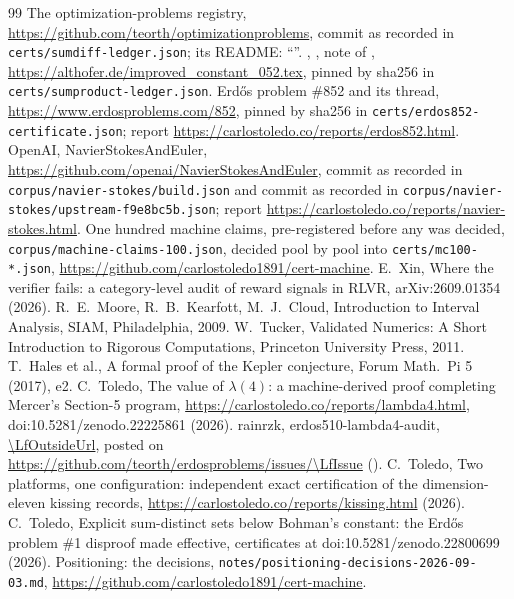 \documentclass[11pt]{article}
\theoremstyle{plain}
\theoremstyle{definition}
\begin{document}
\begin{thebibliography}{99}
 The optimization-problems registry, \url{https://github.com/teorth/optimizationproblems}, commit \OcRegistryCommit{} as recorded in \texttt{certs/sumdiff-ledger.json}; its README: ``\OcStarNote''.
 \SpNoteAuthor, \SpNoteTitle, note of \SpNoteDate, \url{https://althofer.de/improved_constant_052.tex}, pinned by sha256 in \texttt{certs/sumproduct-ledger.json}.
 Erd\H{o}s problem \#852 and its thread, \url{https://www.erdosproblems.com/852}, pinned by sha256 in \texttt{certs/erdos852-certificate.json}; report \url{https://carlostoledo.co/reports/erdos852.html}.
 OpenAI, NavierStokesAndEuler, \url{https://github.com/openai/NavierStokesAndEuler}, commit \NsCommit{} as recorded in \texttt{corpus/navier-stokes/build.json} and commit \NsHeadCommit{} as recorded in \texttt{corpus/navier-stokes/upstream-f9e8bc5b.json}; report \url{https://carlostoledo.co/reports/navier-stokes.html}.
 One hundred machine claims, pre-registered \McRegistered{} before any was decided, \texttt{corpus/machine-claims-100.json}, decided pool by pool into \texttt{certs/mc100-*.json}, \url{https://github.com/carlostoledo1891/cert-machine}.
 E.~Xin, Where the verifier fails: a category-level audit of reward signals in RLVR, arXiv:2609.01354 (2026).
 R.~E.~Moore, R.~B.~Kearfott, M.~J.~Cloud, Introduction to Interval Analysis, SIAM, Philadelphia, 2009.
 W.~Tucker, Validated Numerics: A Short Introduction to Rigorous Computations, Princeton University Press, 2011.
 T.~Hales et al., A formal proof of the Kepler conjecture, Forum Math.\ Pi 5 (2017), e2.
 C.~Toledo, The value of $\lambda(4)$: a machine-derived proof completing Mercer's Section-5 program, \url{https://carlostoledo.co/reports/lambda4.html}, doi:10.5281/zenodo.22225861 (2026).
 rainrzk, erdos510-lambda4-audit, \url{\LfOutsideUrl}, posted on \url{https://github.com/teorth/erdosproblems/issues/\LfIssue} (\LfOutsideDate).
 C.~Toledo, Two platforms, one configuration: independent exact certification of the dimension-eleven kissing records, \url{https://carlostoledo.co/reports/kissing.html} (2026).
 C.~Toledo, Explicit sum-distinct sets below Bohman's constant: the Erd\H{o}s problem \#1 disproof made effective, certificates at doi:10.5281/zenodo.22800699 (2026).
 Positioning: the decisions, \texttt{notes/positioning-decisions-2026-09-03.md}, \url{https://github.com/carlostoledo1891/cert-machine}.

\end{thebibliography}
\end{document}
